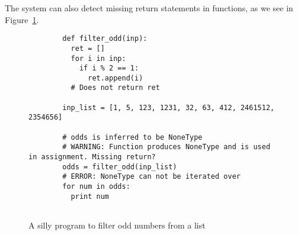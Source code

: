 \documentclass{article}[12pt]
\begin{document}
The system can also detect missing return statements in functions, as we see in
Figure~\ref{fig:noreturn}.
\begin{figure}
    \begin{verbatim}
        def filter_odd(inp):
          ret = []
          for i in inp:
            if i % 2 == 1:
              ret.append(i)
          # Does not return ret

        inp_list = [1, 5, 123, 1231, 32, 63, 412, 2461512, 2354656]

        # odds is inferred to be NoneType
        # WARNING: Function produces NoneType and is used in assignment. Missing return?
        odds = filter_odd(inp_list)
        # ERROR: NoneType can not be iterated over
        for num in odds:
          print num
    
    \end{verbatim}
    \caption{A silly program to filter odd numbers from a list}
    \label{fig:noreturn}
\end{figure}
\end{document}

